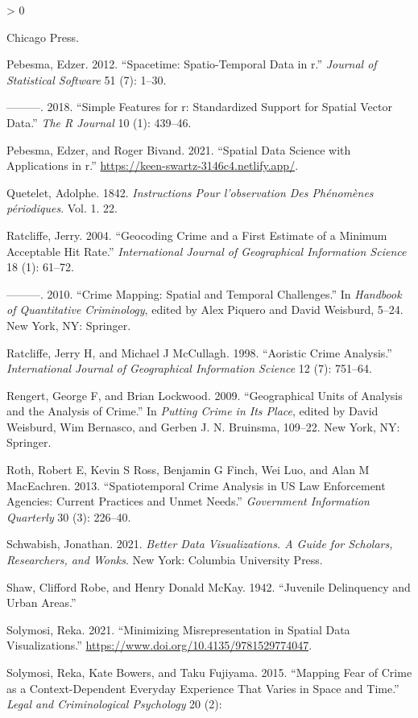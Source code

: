 \documentclass[
]{book}
\newlength{\cslhangindent}
\newenvironment{CSLReferences}[2] %
 {%
  \setlength{\parindent}{0pt}
  \ifodd #1 \everypar{\setlength{\hangindent}{\cslhangindent}}\ignorespaces\fi
  \ifnum #2 > 0
  \setlength{\parskip}{#2\baselineskip}
  \fi
 }%
 {}
\begin{document}
\begin{CSLReferences}{1}{0}
Chicago Press.

\leavevmode\hypertarget{ref-Pebesma_2012}{}%
Pebesma, Edzer. 2012. {``Spacetime: Spatio-Temporal Data in r.''} \emph{Journal of Statistical Software} 51 (7): 1--30.

\leavevmode\hypertarget{ref-Pebesma_2018}{}%
---------. 2018. {``Simple Features for r: Standardized Support for Spatial Vector Data.''} \emph{The R Journal} 10 (1): 439--46.

\leavevmode\hypertarget{ref-Pebesma_2021}{}%
Pebesma, Edzer, and Roger Bivand. 2021. {``Spatial Data Science with Applications in r.''} \url{https://keen-swartz-3146c4.netlify.app/}.

\leavevmode\hypertarget{ref-Quetelet_1842}{}%
Quetelet, Adolphe. 1842. \emph{Instructions Pour l'observation Des Ph{é}nom{è}nes p{é}riodiques}. Vol. 1. 22.

\leavevmode\hypertarget{ref-Ratcliffe_2004}{}%
Ratcliffe, Jerry. 2004. {``Geocoding Crime and a First Estimate of a Minimum Acceptable Hit Rate.''} \emph{International Journal of Geographical Information Science} 18 (1): 61--72.

\leavevmode\hypertarget{ref-Ratcliffe_2010}{}%
---------. 2010. {``Crime Mapping: Spatial and Temporal Challenges.''} In \emph{Handbook of Quantitative Criminology}, edited by Alex Piquero and David Weisburd, 5--24. New York, NY: Springer.

\leavevmode\hypertarget{ref-Ratcliffe_1998}{}%
Ratcliffe, Jerry H, and Michael J McCullagh. 1998. {``Aoristic Crime Analysis.''} \emph{International Journal of Geographical Information Science} 12 (7): 751--64.

\leavevmode\hypertarget{ref-Rengert_2009}{}%
Rengert, George F, and Brian Lockwood. 2009. {``Geographical Units of Analysis and the Analysis of Crime.''} In \emph{Putting Crime in Its Place}, edited by David Weisburd, Wim Bernasco, and Gerben J. N. Bruinsma, 109--22. New York, NY: Springer.

\leavevmode\hypertarget{ref-Roth_2013}{}%
Roth, Robert E, Kevin S Ross, Benjamin G Finch, Wei Luo, and Alan M MacEachren. 2013. {``Spatiotemporal Crime Analysis in US Law Enforcement Agencies: Current Practices and Unmet Needs.''} \emph{Government Information Quarterly} 30 (3): 226--40.

\leavevmode\hypertarget{ref-Schwabish_2021}{}%
Schwabish, Jonathan. 2021. \emph{Better Data Visualizations. A Guide for Scholars, Researchers, and Wonks}. New York: Columbia University Press.

\leavevmode\hypertarget{ref-Shaw_1942}{}%
Shaw, Clifford Robe, and Henry Donald McKay. 1942. {``Juvenile Delinquency and Urban Areas.''}

\leavevmode\hypertarget{ref-Solymosi_2021}{}%
Solymosi, Reka. 2021. {``Minimizing Misrepresentation in Spatial Data Visualizations.''} \url{https://www.doi.org/10.4135/9781529774047}.

\leavevmode\hypertarget{ref-Solymosi_2015}{}%
Solymosi, Reka, Kate Bowers, and Taku Fujiyama. 2015. {``Mapping Fear of Crime as a Context-Dependent Everyday Experience That Varies in Space and Time.''} \emph{Legal and Criminological Psychology} 20 (2): 
\end{CSLReferences}
\end{document}
